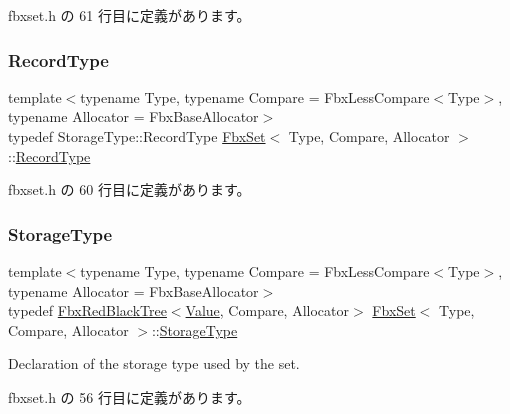  fbxset.\+h の 61 行目に定義があります。

\mbox{\label{class_fbx_set_aa3934cd434a09288204f5e6c99b9cd01}} 
\subsubsection{\texorpdfstring{Record\+Type}{RecordType}}
{\footnotesize\ttfamily template$<$typename Type, typename Compare = Fbx\+Less\+Compare$<$\+Type$>$, typename Allocator = Fbx\+Base\+Allocator$>$ \\
typedef Storage\+Type\+::\+Record\+Type \hyperlink{class_fbx_set}{Fbx\+Set}$<$ Type, Compare, Allocator $>$\+::\hyperlink{class_fbx_set_aa3934cd434a09288204f5e6c99b9cd01}{Record\+Type}}



 fbxset.\+h の 60 行目に定義があります。

\mbox{\label{class_fbx_set_a6d908b9bc11d5418cd2fcceda1342e90}} 
\subsubsection{\texorpdfstring{Storage\+Type}{StorageType}}
{\footnotesize\ttfamily template$<$typename Type, typename Compare = Fbx\+Less\+Compare$<$\+Type$>$, typename Allocator = Fbx\+Base\+Allocator$>$ \\
typedef \hyperlink{class_fbx_red_black_tree}{Fbx\+Red\+Black\+Tree}$<$\hyperlink{class_fbx_set_1_1_value}{Value}, Compare, Allocator$>$ \hyperlink{class_fbx_set}{Fbx\+Set}$<$ Type, Compare, Allocator $>$\+::\hyperlink{class_fbx_set_a6d908b9bc11d5418cd2fcceda1342e90}{Storage\+Type}\hspace{0.3cm}{\ttfamily [protected]}}



Declaration of the storage type used by the set. 



 fbxset.\+h の 56 行目に定義があります。

\mbox{\label{class_fbx_set_abb0f1b628634e07825532526e2e92baf}} 
